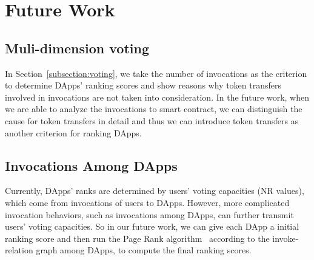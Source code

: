 \section{Future Work}

\subsection{Muli-dimension voting}
\noindent
In Section~\ref{subsection:voting}, we take the number of invocations as the criterion to determine DApps' ranking scores and show reasons why token transfers involved in invocations are not taken into consideration. In the future work, when we are able to analyze the invocations to smart contract, we can  distinguish the cause for token transfers in detail and thus we can introduce token transfers as another criterion for ranking DApps.

\subsection{Invocations Among DApps}
\noindent
Currently, DApps' ranks are determined by users' voting capacities (NR values), which come from invocations of users to DApps. However, more complicated invocation behaviors, such as invocations among DApps, can further transmit users' voting capacities. So in our future work, we can give each DApp a initial ranking score and then run the Page Rank algorithm~\cite{page1999pagerank} according to the invoke-relation graph among DApps, to compute the final ranking scores.
